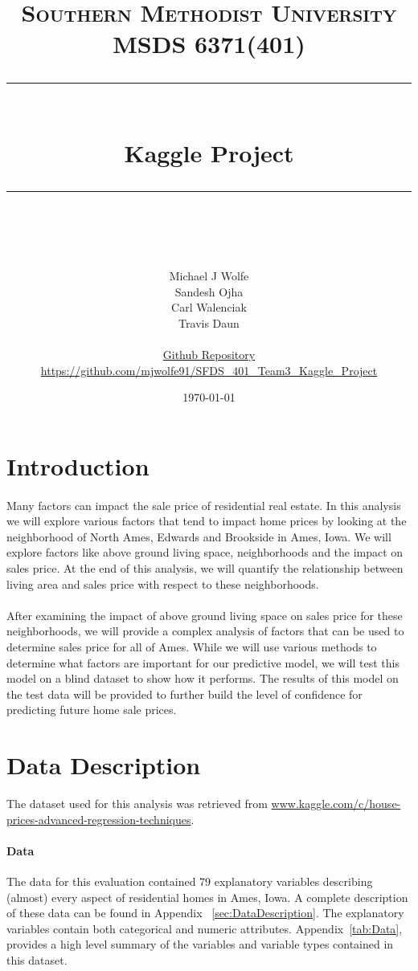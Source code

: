 \documentclass[11pt]{scrartcl} %
\title{	
	\normalfont\normalsize
	\textsc{Southern Methodist University\\
	 MSDS 6371(401)}\\ %
	\vspace{25pt} %
	\rule{\linewidth}{0.5pt}\\ %
	\vspace{20pt} %
	{\huge Kaggle Project}\\ %
	\vspace{12pt} %
	\rule{\linewidth}{2pt}\\ %
	\vspace{12pt} %
}
\author{\LARGE Michael J Wolfe\\
			\LARGE Sandesh Ojha\\
			\LARGE Carl Walenciak\\
			\LARGE Travis Daun\\
			\\
			\small \href{https://github.com/mjwolfe91/SFDS_401_Team3_Kaggle_Project}{Github Repository}\\
			\small \href{https://github.com/mjwolfe91/SFDS_401_Team3_Kaggle_Project}{https://github.com/mjwolfe91/SFDS\_401\_Team3\_Kaggle\_Project}\\} %
\date{\normalsize\today} %
\begin{document}
\maketitle %


\pagebreak


\tableofcontents{}
\pagebreak


\section{Introduction}
\paragraph{} Many factors can impact the sale price of residential real estate.  In this analysis we will explore various factors that tend to impact home prices by looking at the neighborhood of North Ames, Edwards and Brookside in Ames, Iowa.  We will explore factors like above ground living space, neighborhoods and the impact on sales price.  At the end of this analysis, we will quantify the relationship between living area and sales price with respect to these neighborhoods.

\paragraph{} After examining the impact of above ground living space on sales price for these neighborhoods, we will provide a complex analysis of factors that can be used to determine sales price for all of Ames.  While we will use various methods to determine what factors are important for our predictive model, we will test this model on a blind dataset to show how it performs. The results of this model on the test data will be provided to further build the level of confidence for predicting future home sale prices.

\section{Data Description}
The dataset used for this analysis was retrieved from \href{https://www.kaggle.com/c/house-prices-advanced-regression-techniques}{www.kaggle.com/c/house-prices-advanced-regression-techniques}.
\paragraph{Data} The data for this evaluation contained 79 explanatory variables describing (almost) every aspect of residential homes in Ames, Iowa. A complete description of these data can be found in Appendix ~\ref{sec:DataDescription}. The explanatory variables contain both categorical and numeric attributes.  Appendix~\ref{tab:Data}, provides a high level summary of the variables and variable types contained in this dataset.
\end{document}
